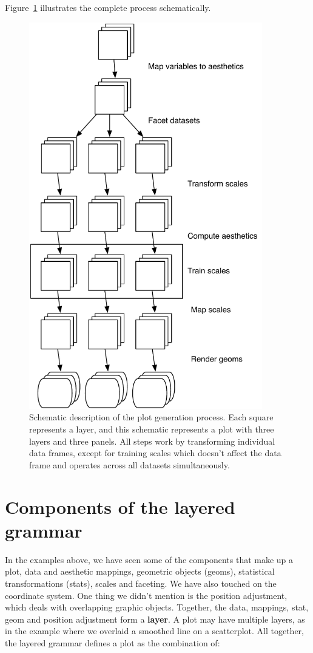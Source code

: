 Figure~\ref{fig:schematic} illustrates the complete process schematically.

\begin{figure}[htbp]
  \centering
  \includegraphics[width=4in]{mastery-schema}
  \caption{Schematic description of the plot generation process. Each square represents a layer, and this schematic represents a plot with three layers and three panels. All steps work by transforming individual data frames, except for training scales which doesn't affect the data frame and operates across all datasets simultaneously.}
  \label{fig:schematic}
\end{figure}

\section{Components of the layered grammar}
\label{sec:components}

In the examples above, we have seen some of the components that make up a plot, data and aesthetic mappings, geometric objects (geoms), statistical transformations (stats), scales and faceting. We have also touched on the coordinate system. One thing we didn't mention is the position adjustment, which deals with overlapping graphic objects. Together, the data, mappings, stat, geom and position adjustment form a {\bf layer}. A plot may have multiple layers, as in the example where we overlaid a smoothed line on a scatterplot. All together, the layered grammar defines a plot as the combination of:

